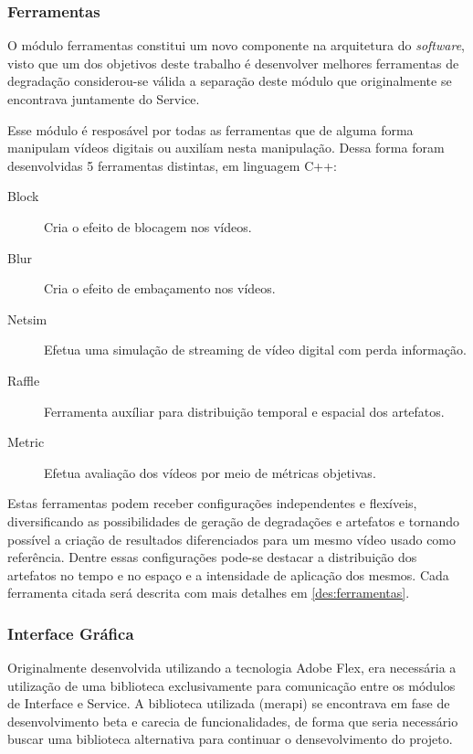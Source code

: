 \subsubsection{Ferramentas}
\label{met:ferramentas}

O módulo ferramentas constitui um novo componente na arquitetura do \emph{software}, visto que um dos objetivos deste trabalho é desenvolver melhores ferramentas de degradação considerou-se válida a separação deste módulo que originalmente se encontrava juntamente do Service.

Esse módulo é resposável por todas as ferramentas que de alguma forma manipulam vídeos digitais ou auxilíam nesta manipulação. Dessa forma foram desenvolvidas 5 ferramentas distintas, em linguagem C++:

\begin{description}
	\item[Block] Cria o efeito de blocagem nos vídeos.
	\item[Blur] Cria o efeito de embaçamento nos vídeos.
	\item[Netsim] Efetua uma simulação de streaming de vídeo digital com perda informação.
	\item[Raffle] Ferramenta auxíliar para distribuição temporal e espacial dos artefatos.
	\item[Metric] Efetua avaliação dos vídeos por meio de métricas objetivas.
\end{description}

Estas ferramentas podem receber configurações independentes e flexíveis, diversificando as possibilidades de geração de degradações e artefatos e tornando possível a criação de resultados diferenciados para um mesmo vídeo usado como referência. Dentre essas configurações pode-se destacar a distribuição dos artefatos no tempo e no espaço e a intensidade de aplicação dos mesmos. Cada ferramenta citada será descrita com mais detalhes em \ref{des:ferramentas}. 

\subsubsection{Interface Gráfica}

Originalmente desenvolvida utilizando a tecnologia Adobe Flex, era necessária a utilização de uma biblioteca exclusivamente para comunicação entre os módulos de Interface e Service. A biblioteca utilizada (merapi) se encontrava em fase de desenvolvimento beta e carecia de funcionalidades, de forma que seria necessário buscar uma biblioteca alternativa para continuar o densevolvimento do projeto.

